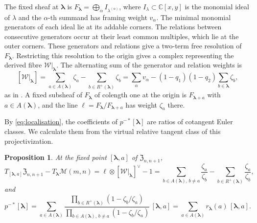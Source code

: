 \documentclass[11pt]{amsart}
\newtheorem{proposition}[theorem]{Proposition}
\theoremstyle{definition}
\theoremstyle{remark}
\newcommand{\bl}{{\boldsymbol{\lambda}}}         %
\newcommand{\Add}[1]{A(#1)}                      %
\newcommand{\bwt}[1]{\zeta_{#1}}                 %
\newcommand{\res}[2]{r_{#1}(#2)}                 %
\newcommand{\Remp}[1]{R^{+}(#1)}                 %
\newcommand{\Gies}[2]{\mathcal M(#1,#2)}         %
\newcommand{\Zc}{\mathfrak Z}
\newcommand{\Hecke}[1]{\Zc_{#1,#1+1}}            %
\newcommand{\Sh}{F}                              %
\newcommand{\Fsh}[1]{\Sh_{#1}}                   %
\newcommand{\Wc}{\mathcal W}                     %
\newcommand{\fix}[1]{[#1]}                       %
\newcommand{\pt}[2]{[#1,#2]}                     %
\newcommand{\taut}{\ell}                         %
\newcommand{\pulm}{p^{-*}}                       %
\begin{document}
The fixed sheaf at \(\bl\) is \(\Fsh{\bl}=\bigoplus_\alpha I_{\lambda^{(\alpha)}}\),
where \(I_\lambda\subset\mathbb C[x,y]\) is the monomial ideal of \(\lambda\) and
the \(\alpha\)-th summand has framing weight \(v_\alpha\).
The minimal monomial generators of each ideal lie at its addable corners.
The relations between consecutive generators occur at their least common multiples,
which lie at the outer corners. These generators and relations give a two-term free
resolution of \(\Fsh{\bl}\). Restricting this resolution to the origin gives a complex
representing the derived fibre \(\Wc|_\bl\). The alternating sum of the generator
and relation weights is
\begin{equation}\label{eq:Wcharacter}
 [\Wc|_\bl]=\sum_{a\in\Add{\bl}}\bwt{a}-\sum_{b\in\Remp{\bl}}\bwt{b}
 =\sum_\alpha v_\alpha-(1-q_1)(1-q_2)\sum_{b\in\bl}\bwt{b},
\end{equation}
as in \cite[(2.6) and (5.4)]{N1}. A fixed subsheaf of \(\Fsh{\bl}\) of colength one at the
origin is \(\Fsh{\bl+a}\) with \(a\in\Add{\bl}\), and the line
\(\taut=\Fsh{\bl}/\Fsh{\bl+a}\) has weight \(\bwt{a}\) there.

By \eqref{eq:localisation}, the coefficients of \(\pulm\fix{\bl}\) are ratios of
cotangent Euler classes. We calculate them from the virtual relative tangent class
of this projectivization.

\begin{proposition}\label{prop:pullback}
At the fixed point \(\pt{\bl}{a}\) of \(\Hecke{n}\),
\[
 T_{\pt{\bl}{a}}\Hecke{n}-T_\bl\Gies{m}{n}
 =\taut\otimes[\Wc|_\bl]^\vee-1
 =\sum_{b\in\Add{\bl},\,b\neq a}\frac{\bwt{a}}{\bwt{b}}
  -\sum_{b\in\Remp{\bl}}\frac{\bwt{a}}{\bwt{b}},
\]
and
\begin{equation}\label{eq:pullfixed}
 \pulm\fix{\bl}
 =\sum_{a\in\Add{\bl}}
  \frac{\prod_{b\in\Remp{\bl}}(1-\bwt{b}/\bwt{a})}
       {\prod_{b\in\Add{\bl},\,b\neq a}(1-\bwt{b}/\bwt{a})}\,\pt{\bl}{a}
 =\sum_{a\in\Add{\bl}}\res{\bl}{a}\,\pt{\bl}{a}.
\end{equation}
\end{proposition}
\end{document}
